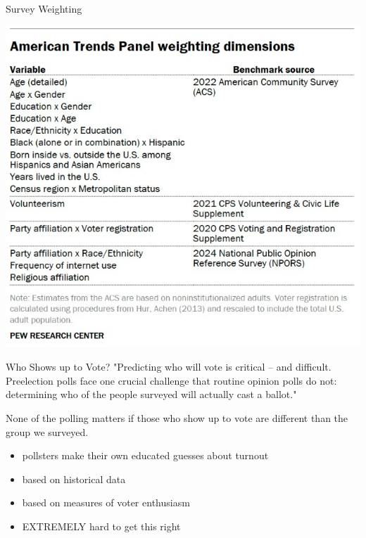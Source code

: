 \documentclass{beamer}
\begin{document}
\begin{frame}{Survey Weighting}
\begin{center}
    \includegraphics[scale=.75]{img/survey_weighting_variables.jpg}
\end{center} 
\end{frame}

\begin{frame}{Who Shows up to Vote?}
"Predicting who will vote is critical – and difficult. Preelection polls face one crucial challenge that routine opinion polls do not: determining who of the people surveyed will actually cast a ballot." \vspace{8mm}

None of the polling matters if those who show up to vote are different than the group we surveyed.
\begin{itemize}
    \item pollsters make their own educated guesses about turnout
    \item based on historical data
    \item based on measures of voter enthusiasm
    \item EXTREMELY hard to get this right
\end{itemize}
\end{frame}
\end{document}
